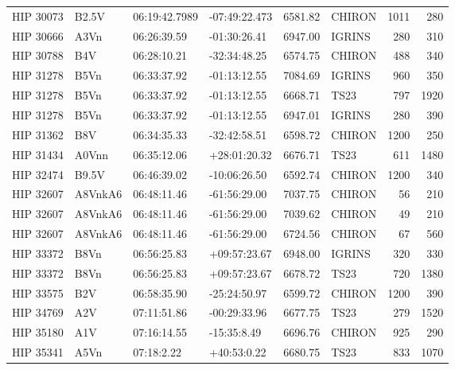 \documentclass{emulateapj}
\begin{document}
\begin{longtable*}{|l|lllrlrr|}
   HIP 30073 &          B2.5V &  06:19:42.7989 &  -07:49:22.473 &  6581.82 &     CHIRON &     1011 &     280 \\
   HIP 30666 &           A3Vn &    06:26:39.59 &   -01:30:26.41 &  6947.00 &     IGRINS &      280 &     310 \\
   HIP 30788 &            B4V &    06:28:10.21 &   -32:34:48.25 &  6574.75 &     CHIRON &      488 &     340 \\
   HIP 31278 &           B5Vn &    06:33:37.92 &   -01:13:12.55 &  7084.69 &     IGRINS &      960 &     350 \\
   HIP 31278 &           B5Vn &    06:33:37.92 &   -01:13:12.55 &  6668.71 &       TS23 &      797 &    1920 \\
   HIP 31278 &           B5Vn &    06:33:37.92 &   -01:13:12.55 &  6947.01 &     IGRINS &      280 &     390 \\
   HIP 31362 &            B8V &    06:34:35.33 &   -32:42:58.51 &  6598.72 &     CHIRON &     1200 &     250 \\
   HIP 31434 &          A0Vnn &    06:35:12.06 &   +28:01:20.32 &  6676.71 &       TS23 &      611 &    1480 \\
   HIP 32474 &          B9.5V &    06:46:39.02 &   -10:06:26.50 &  6592.74 &     CHIRON &     1200 &     340 \\
   HIP 32607 &        A8VnkA6 &    06:48:11.46 &   -61:56:29.00 &  7037.75 &     CHIRON &       56 &     210 \\
   HIP 32607 &        A8VnkA6 &    06:48:11.46 &   -61:56:29.00 &  7039.62 &     CHIRON &       49 &     210 \\
   HIP 32607 &        A8VnkA6 &    06:48:11.46 &   -61:56:29.00 &  6724.56 &     CHIRON &       67 &     560 \\
   HIP 33372 &           B8Vn &    06:56:25.83 &   +09:57:23.67 &  6948.00 &     IGRINS &      320 &     330 \\
   HIP 33372 &           B8Vn &    06:56:25.83 &   +09:57:23.67 &  6678.72 &       TS23 &      720 &    1380 \\
   HIP 33575 &            B2V &    06:58:35.90 &   -25:24:50.97 &  6599.72 &     CHIRON &     1200 &     390 \\
   HIP 34769 &            A2V &    07:11:51.86 &   -00:29:33.96 &  6677.75 &       TS23 &      279 &    1520 \\
   HIP 35180 &            A1V &    07:16:14.55 &    -15:35:8.49 &  6696.76 &     CHIRON &      925 &     290 \\
   HIP 35341 &           A5Vn &     07:18:2.22 &    +40:53:0.22 &  6680.75 &       TS23 &      833 &    1070 \\

\end{longtable*}
\end{document}
